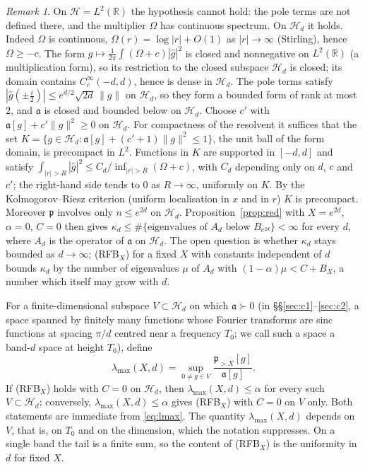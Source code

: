 \documentclass[11pt]{amsart}
\theoremstyle{definition}
\theoremstyle{remark}
\newtheorem{remark}[theorem]{Remark}
\newcommand{\fa}{\mathfrak a}
\newcommand{\fp}{\mathfrak p}
\begin{document}
\begin{remark}
On $\mathcal H=L^2(\mathbb R)$ the hypothesis cannot hold: the pole terms are
not defined there, and the multiplier $\Omega$ has continuous spectrum. On $\mathcal H_d$ it holds. Indeed $\Omega$ is
continuous, $\Omega(r)=\log|r|+O(1)$ as $|r|\to\infty$ (Stirling), hence
$\Omega\ge-c$. The form $g\mapsto\frac1{2\pi}\int(\Omega+c)|\widehat g|^2$ is
closed and nonnegative on $L^2(\mathbb R)$ (a multiplication form), so its
restriction to the closed subspace $\mathcal H_d$ is closed; its domain contains
$C_c^\infty(-d,d)$, hence is dense in $\mathcal H_d$. The pole terms satisfy
$|\widehat g(\pm\tfrac i2)|\le e^{d/2}\sqrt{2d}\,\|g\|$ on $\mathcal H_d$, so they
form a bounded form of rank at most $2$, and $\fa$ is closed and bounded below
on $\mathcal H_d$. Choose $c'$ with $\fa[g]+c'\|g\|^2\ge0$ on $\mathcal H_d$. For
compactness of the resolvent it suffices that the set
$K=\{g\in\mathcal H_d:\fa[g]+(c'+1)\|g\|^2\le1\}$, the unit ball of the form
domain, is precompact in $L^2$. Functions in $K$ are supported in $[-d,d]$ and
satisfy $\int_{|r|>R}|\widehat g|^2\le C_d/\inf_{|r|>R}(\Omega+c)$, with
$C_d$ depending only on $d$, $c$ and $c'$; the right-hand side tends to $0$
as $R\to\infty$, uniformly on $K$. By the Kolmogorov--Riesz criterion (uniform
localisation in $x$ and in $r$) $K$ is precompact. Moreover $\fp$ involves only
$n\le e^{2d}$ on $\mathcal H_d$. Proposition~\ref{prop:red} with
$X=e^{2d}$, $\alpha=0$, $C=0$ then gives
$\kappa_d\le\#\{\text{eigenvalues of }A_d\text{ below }B_{e^{2d}}\}<\infty$
for every $d$, where $A_d$ is the operator of $\fa$ on $\mathcal H_d$. The open
question is whether $\kappa_d$ stays bounded as $d\to\infty$; (RFB$_X$) for a
fixed $X$ with constants independent of $d$ bounds $\kappa_d$ by the number of
eigenvalues $\mu$ of $A_d$ with $(1-\alpha)\mu<C+B_X$, a number which itself may
grow with $d$.
\end{remark}

For a finite-dimensional subspace $V\subset\mathcal H_d$ on which $\fa\succ0$
(in \S\S\ref{sec:c1}--\ref{sec:c2}, a space spanned by finitely many functions
whose Fourier transforms are sinc functions at spacing $\pi/d$ centred near a
frequency $T_0$; we call such a space a band-$d$ space at height $T_0$), define
\begin{equation}\label{eq:lmax}
\lambda_{\max}(X,d)=\sup_{0\ne g\in V}\frac{\fp_{>X}[g]}{\fa[g]}.
\end{equation}
If (RFB$_X$) holds with $C=0$ on $\mathcal H_d$, then
$\lambda_{\max}(X,d)\le\alpha$ for every such $V\subset\mathcal H_d$;
conversely, $\lambda_{\max}(X,d)\le\alpha$ gives (RFB$_X$) with $C=0$ on $V$
only. Both statements are immediate from \eqref{eq:lmax}. The quantity
$\lambda_{\max}(X,d)$ depends on $V$, that is, on $T_0$ and on the dimension,
which the notation suppresses. On a single band the tail is a finite sum, so the content of
(RFB$_X$) is the uniformity in $d$ for fixed $X$.
\end{document}
